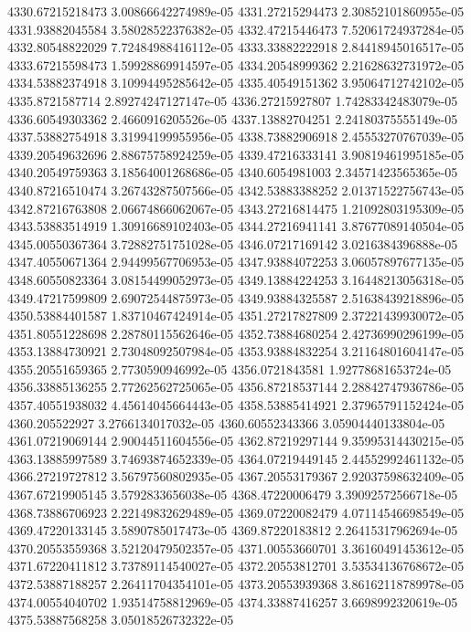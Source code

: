 {4330.67215218473 3.00866642274989e-05
4331.27215294473 2.30852101860955e-05
4331.93882045584 3.58028522376382e-05
4332.47215446473 7.52061724937284e-05
4332.80548822029 7.72484988416112e-05
4333.33882222918 2.84418945016517e-05
4333.67215598473 1.59928869914597e-05
4334.20548999362 2.21628632731972e-05
4334.53882374918 3.10994495285642e-05
4335.40549151362 3.95064712742102e-05
4335.8721587714 2.89274247127147e-05
4336.27215927807 1.74283342483079e-05
4336.60549303362 2.4660916205526e-05
4337.13882704251 2.24180375555149e-05
4337.53882754918 3.31994199955956e-05
4338.73882906918 2.45553270767039e-05
4339.20549632696 2.88675758924259e-05
4339.47216333141 3.90819461995185e-05
4340.20549759363 3.18564001268686e-05
4340.6054981003 2.34571423565365e-05
4340.87216510474 3.26743287507566e-05
4342.53883388252 2.01371522756743e-05
4342.87216763808 2.06674866062067e-05
4343.27216814475 1.21092803195309e-05
4343.53883514919 1.30916689102403e-05
4344.27216941141 3.87677089140504e-05
4345.00550367364 3.72882751751028e-05
4346.07217169142 3.0216384396888e-05
4347.40550671364 2.94499567706953e-05
4347.93884072253 3.06057897677135e-05
4348.60550823364 3.08154499052973e-05
4349.13884224253 3.16448213056318e-05
4349.47217599809 2.69072544875973e-05
4349.93884325587 2.51638439218896e-05
4350.53884401587 1.83710467424914e-05
4351.27217827809 2.37221439930072e-05
4351.80551228698 2.28780115562646e-05
4352.73884680254 2.42736990296199e-05
4353.13884730921 2.73048092507984e-05
4353.93884832254 3.21164801604147e-05
4355.20551659365 2.7730590946992e-05
4356.0721843581 1.92778681653724e-05
4356.33885136255 2.77262562725065e-05
4356.87218537144 2.28842747936786e-05
4357.40551938032 4.45614045664443e-05
4358.53885414921 2.37965791152424e-05
4360.205522927 3.2766134017032e-05
4360.60552343366 3.05904440133804e-05
4361.07219069144 2.90044511604556e-05
4362.87219297144 9.35995314430215e-05
4363.13885997589 3.74693874652339e-05
4364.07219449145 2.44552992461132e-05
4366.27219727812 3.56797560802935e-05
4367.20553179367 2.92037598632409e-05
4367.67219905145 3.5792833656038e-05
4368.47220006479 3.39092572566718e-05
4368.73886706923 2.22149832629489e-05
4369.07220082479 4.07114546698549e-05
4369.47220133145 3.5890785017473e-05
4369.87220183812 2.26415317962694e-05
4370.20553559368 3.52120479502357e-05
4371.00553660701 3.36160491453612e-05
4371.67220411812 3.73789114540027e-05
4372.20553812701 3.53534136768672e-05
4372.53887188257 2.26411704354101e-05
4373.20553939368 3.86162118789978e-05
4374.00554040702 1.93514758812969e-05
4374.33887416257 3.6698992320619e-05
4375.53887568258 3.05018526732322e-05
}
